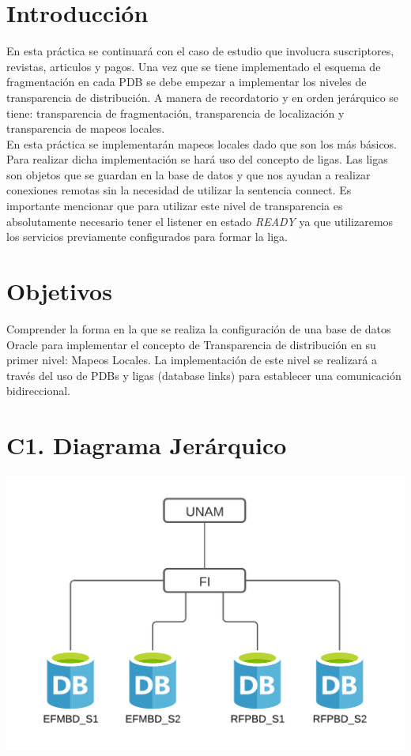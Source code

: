 \documentclass{article}
\begin{document}
\newpage

\section*{Introducción}

En esta práctica se continuará con el caso de estudio que involucra 
suscriptores, revistas, articulos y pagos. Una vez que se tiene implementado
el esquema de fragmentación en cada PDB se debe empezar a implementar los
niveles de transparencia de distribución. A manera de recordatorio y en orden 
jerárquico se tiene: transparencia de fragmentación, transparencia de 
localización y transparencia de mapeos locales. \\

En esta práctica se implementarán mapeos locales dado que son los más básicos.
Para realizar dicha implementación se hará uso del concepto de ligas. Las
ligas son objetos que se guardan en la base de datos y que nos ayudan a 
realizar conexiones remotas sin la necesidad de utilizar la sentencia connect.
Es importante mencionar que para utilizar este nivel de transparencia es 
absolutamente necesario tener el listener en estado \textit{READY} ya que 
utilizaremos los servicios previamente configurados para formar la liga.

\section*{Objetivos}

Comprender la forma en la que se realiza la configuración de una base de datos 
Oracle para implementar el concepto de Transparencia de distribución en su 
primer nivel: Mapeos Locales. La implementación de este nivel se realizará a 
través del uso de PDBs y ligas (database links) para establecer una 
comunicación bidireccional.

\section*{C1. Diagrama Jerárquico }

\begin{center}
  \includegraphics[width=0.7\linewidth]{diagrama.png}
\end{center}
\end{document}

